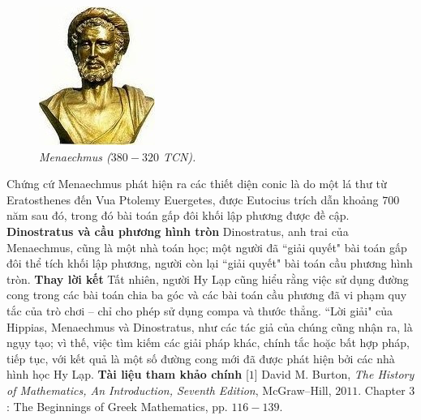 \begin{multicols}{2}
	\begin{figure}[H]
		\vspace*{-5pt}
		\centering
		\captionsetup{labelformat= empty, justification=centering}
		\includegraphics[width= 0.65\linewidth]{3}
		\caption{\small\textit{\color{lichsutoanhoc}Menaechmus ($380-320$ TCN).}}
		\vspace*{-10pt}
	\end{figure}
	Chứng cứ Menaechmus phát hiện ra các thiết diện conic là do một lá thư từ Eratosthenes đến Vua Ptolemy Euergetes, được Eutocius trích dẫn khoảng $700$ năm sau đó, trong đó bài toán gấp đôi khối lập phương được đề cập. 
	\vskip 0.05cm
	\textbf{\color{lichsutoanhoc}Dinostratus và cầu phương hình tròn}
	\vskip 0.05cm
	Dinostratus, anh trai của Menaechmus, cũng là một nhà toán học; một người đã ``giải quyết" bài toán gấp đôi thể tích khối lập phương, người còn lại ``giải quyết" bài toán cầu phương hình tròn. 
	\vskip 0.05cm
	\textbf{\color{lichsutoanhoc}Thay lời kết}
	\vskip 0.05cm
	Tất nhiên, người Hy Lạp cũng hiểu rằng việc sử dụng đường cong trong các bài toán chia ba góc và các bài toán cầu phương đã vi phạm quy tắc của trò chơi -- chỉ cho phép sử dụng compa và thước thẳng. ``Lời giải" của Hippias, Menaechmus và Dinostratus, như các tác giả của chúng cũng nhận ra, là ngụy tạo; vì thế, việc tìm kiếm các giải pháp khác, chính tắc hoặc bất hợp pháp, tiếp tục, với kết quả là một số đường cong mới đã được phát hiện bởi các nhà hình học Hy Lạp.
	\vskip 0.05cm
	\textbf{\color{lichsutoanhoc}Tài liệu tham khảo chính}
	\vskip 0.05cm
	[$1$] David M. Burton, \textit{The History of Mathematics, An Introduction, Seventh Edition}, McGraw--Hill, $2011$. Chapter $3$: The Beginnings of Greek Mathematics, pp. $116-139$.

\end{multicols}
